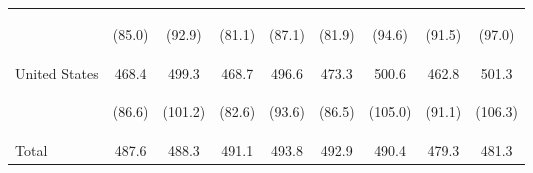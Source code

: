 \begin{center}
\begin{tabular}{lcccccccc}
 & \begin{footnotesize}(85.0)\end{footnotesize} & \begin{footnotesize}(92.9)\end{footnotesize} & \begin{footnotesize}(81.1)\end{footnotesize} & \begin{footnotesize}(87.1)\end{footnotesize} & \begin{footnotesize}(81.9)\end{footnotesize} & \begin{footnotesize}(94.6)\end{footnotesize} & \begin{footnotesize}(91.5)\end{footnotesize} & \begin{footnotesize}(97.0)\end{footnotesize}\\
\noalign{\smallskip}United States & 468.4 & 499.3 & 468.7 & 496.6 & 473.3 & 500.6 & 462.8 & 501.3\\
 & \begin{footnotesize}(86.6)\end{footnotesize} & \begin{footnotesize}(101.2)\end{footnotesize} & \begin{footnotesize}(82.6)\end{footnotesize} & \begin{footnotesize}(93.6)\end{footnotesize} & \begin{footnotesize}(86.5)\end{footnotesize} & \begin{footnotesize}(105.0)\end{footnotesize} & \begin{footnotesize}(91.1)\end{footnotesize} & \begin{footnotesize}(106.3)\end{footnotesize}\\
\noalign{\smallskip}Total & 487.6 & 488.3 & 491.1 & 493.8 & 492.9 & 490.4 & 479.3 & 481.3\\

\end{tabular}
\end{center}
